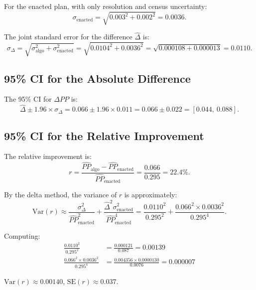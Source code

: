 For the enacted plan, with only resolution and census uncertainty:
\begin{equation}
  \sigma_\text{enacted} = \sqrt{0.003^2 + 0.002^2} = 0.0036.
\end{equation}

The joint standard error for the difference $\hat\Delta$ is:
\begin{equation}
  \sigma_\Delta = \sqrt{\sigma^2_\text{algo} + \sigma^2_\text{enacted}}
  = \sqrt{0.0104^2 + 0.0036^2}
  = \sqrt{0.000108 + 0.000013}
  = 0.0110.
\end{equation}

\subsection{95\% CI for the Absolute Difference}

The 95\% CI for $\Delta PP$ is:
\begin{equation}
  \hat\Delta \pm 1.96 \times \sigma_\Delta
  = 0.066 \pm 1.96 \times 0.011
  = 0.066 \pm 0.022
  = [0.044,\ 0.088].
\end{equation}

\subsection{95\% CI for the Relative Improvement}

The relative improvement is:
\begin{equation}
  r = \frac{\hat{PP}_\text{algo} - \hat{PP}_\text{enacted}}
           {\hat{PP}_\text{enacted}}
  = \frac{0.066}{0.295} = 22.4\%.
\end{equation}

By the delta method, the variance of $r$ is approximately:
\begin{equation}
  \text{Var}(r) \approx \frac{\sigma^2_\Delta}{\hat{PP}_\text{enacted}^2}
  + \frac{\hat\Delta^2 \sigma^2_\text{enacted}}{\hat{PP}_\text{enacted}^4}
  = \frac{0.0110^2}{0.295^2}
  + \frac{0.066^2 \times 0.0036^2}{0.295^4}.
\end{equation}

Computing:
\begin{align}
  \frac{0.0110^2}{0.295^2} &= \frac{0.000121}{0.087} = 0.00139 \\
  \frac{0.066^2 \times 0.0036^2}{0.295^4} &=
    \frac{0.004356 \times 0.0000130}{0.0076} = 0.000007
\end{align}

$\text{Var}(r) \approx 0.00140$, $\text{SE}(r) \approx 0.037$.

